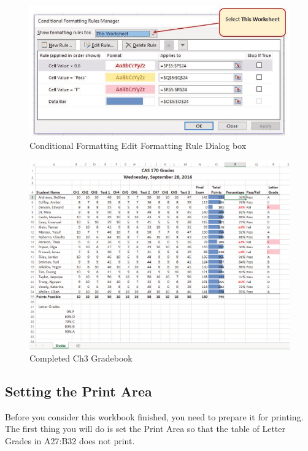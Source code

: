 \begin{figure}[H]
	\centering
	\includegraphics[width=\maxwidth{.95\linewidth}]{gfx/ch03_fig24}
	\caption{Conditional Formatting Edit Formatting Rule Dialog box}
	\label{03:fig24}
\end{figure}

\begin{figure}[H]
	\centering
	\includegraphics[width=\maxwidth{.95\linewidth}]{gfx/ch03_fig25}
	\caption{Completed Ch3 Gradebook}
	\label{03:fig25}
\end{figure}


\subsection{Setting the Print Area}

Before you consider this workbook finished, you need to prepare it for printing. The first thing you
will do is set the Print Area so that the table of Letter Grades in A27:B32 does not print.

